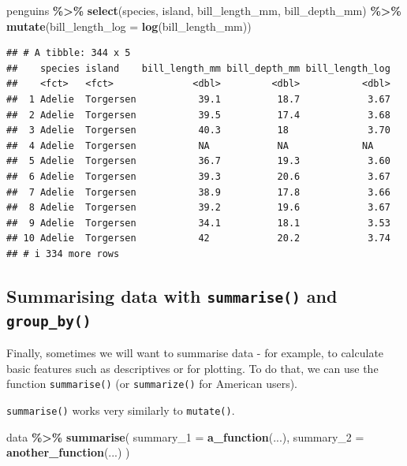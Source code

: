 \documentclass[
]{book}
\newenvironment{Shaded}{\begin{snugshade}}{\end{snugshade}}
\newcommand{\AttributeTok}[1]{\textcolor[rgb]{0.13,0.29,0.53}{#1}}
\newcommand{\FunctionTok}[1]{\textcolor[rgb]{0.13,0.29,0.53}{\textbf{#1}}}
\newcommand{\NormalTok}[1]{#1}
\newcommand{\SpecialCharTok}[1]{\textcolor[rgb]{0.81,0.36,0.00}{\textbf{#1}}}
\begin{document}
\begin{Shaded}
\begin{Highlighting}[]
\NormalTok{penguins }\SpecialCharTok{\%\textgreater{}\%}
  \FunctionTok{select}\NormalTok{(species, island, bill\_length\_mm, bill\_depth\_mm) }\SpecialCharTok{\%\textgreater{}\%}
  \FunctionTok{mutate}\NormalTok{(}\AttributeTok{bill\_length\_log =} \FunctionTok{log}\NormalTok{(bill\_length\_mm))}
\end{Highlighting}
\end{Shaded}

\begin{verbatim}
## # A tibble: 344 x 5
##    species island    bill_length_mm bill_depth_mm bill_length_log
##    <fct>   <fct>              <dbl>         <dbl>           <dbl>
##  1 Adelie  Torgersen           39.1          18.7            3.67
##  2 Adelie  Torgersen           39.5          17.4            3.68
##  3 Adelie  Torgersen           40.3          18              3.70
##  4 Adelie  Torgersen           NA            NA             NA   
##  5 Adelie  Torgersen           36.7          19.3            3.60
##  6 Adelie  Torgersen           39.3          20.6            3.67
##  7 Adelie  Torgersen           38.9          17.8            3.66
##  8 Adelie  Torgersen           39.2          19.6            3.67
##  9 Adelie  Torgersen           34.1          18.1            3.53
## 10 Adelie  Torgersen           42            20.2            3.74
## # i 334 more rows
\end{verbatim}

\subsection{\texorpdfstring{Summarising data with \texttt{summarise()} and \texttt{group\_by()}}{Summarising data with summarise() and group\_by()}}\label{summarising-data-with-summarise-and-group_by}

Finally, sometimes we will want to summarise data - for example, to calculate basic features such as descriptives or for plotting. To do that, we can use the function \texttt{summarise()} (or \texttt{summarize()} for American users).

\texttt{summarise()} works very similarly to \texttt{mutate()}.

\begin{Shaded}
\begin{Highlighting}[]
\NormalTok{data }\SpecialCharTok{\%\textgreater{}\%}
  \FunctionTok{summarise}\NormalTok{(}
    \AttributeTok{summary\_1 =} \FunctionTok{a\_function}\NormalTok{(...),}
    \AttributeTok{summary\_2 =} \FunctionTok{another\_function}\NormalTok{(...)}
\NormalTok{    )}
\end{Highlighting}
\end{Shaded}
\end{document}
